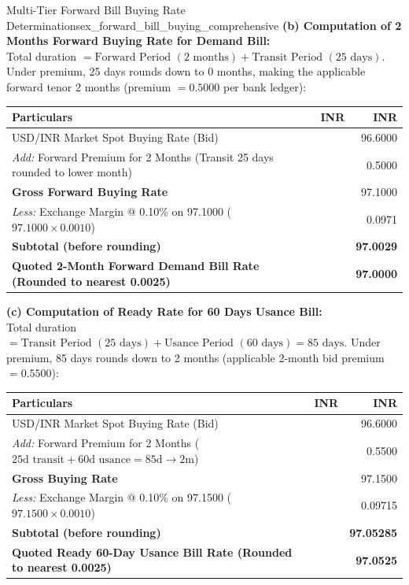 \begin{example}{Multi-Tier Forward Bill Buying Rate Determinations}{ex_forward_bill_buying_comprehensive}
\noindent\textbf{(b) Computation of 2 Months Forward Buying Rate for Demand Bill:}\\
Total duration $= \text{Forward Period } (2 \text{ months}) + \text{Transit Period } (25 \text{ days})$. Under premium, 25 days rounds down to 0 months, making the applicable forward tenor 2 months (premium $= 0.5000$ per bank ledger):
\begin{center}
\begin{tabularx}{0.96\linewidth}{Xrr}
    \toprule
    \textbf{Particulars} & \textbf{INR} & \textbf{INR} \\
    \midrule
    USD/INR Market Spot Buying Rate (Bid) & & 96.6000 \\
    \textit{Add:} Forward Premium for 2 Months (Transit 25 days rounded to lower month) & & 0.5000 \\
    \midrule
    \textbf{Gross Forward Buying Rate} & & 97.1000 \\
    \textit{Less:} Exchange Margin @ 0.10\% on 97.1000 ($97.1000 \times 0.0010$) & & 0.0971 \\
    \midrule
    \textbf{Subtotal (before rounding)} & & \textbf{97.0029} \\
    \textbf{Quoted 2-Month Forward Demand Bill Rate (Rounded to nearest 0.0025)} & & \textbf{97.0000} \\
    \bottomrule
\end{tabularx}
\end{center}

\noindent\textbf{(c) Computation of Ready Rate for 60 Days Usance Bill:}\\
Total duration $= \text{Transit Period } (25 \text{ days}) + \text{Usance Period } (60 \text{ days}) = 85 \text{ days}$. Under premium, 85 days rounds down to 2 months (applicable 2-month bid premium $= 0.5500$):
\begin{center}
\begin{tabularx}{0.96\linewidth}{Xrr}
    \toprule
    \textbf{Particulars} & \textbf{INR} & \textbf{INR} \\
    \midrule
    USD/INR Market Spot Buying Rate (Bid) & & 96.6000 \\
    \textit{Add:} Forward Premium for 2 Months ($25\text{d transit} + 60\text{d usance} = 85\text{d} \to 2\text{m}$) & & 0.5500 \\
    \midrule
    \textbf{Gross Buying Rate} & & 97.1500 \\
    \textit{Less:} Exchange Margin @ 0.10\% on 97.1500 ($97.1500 \times 0.0010$) & & 0.09715 \\
    \midrule
    \textbf{Subtotal (before rounding)} & & \textbf{97.05285} \\
    \textbf{Quoted Ready 60-Day Usance Bill Rate (Rounded to nearest 0.0025)} & & \textbf{97.0525} \\
    \bottomrule
\end{tabularx}
\end{center}


\end{example}
